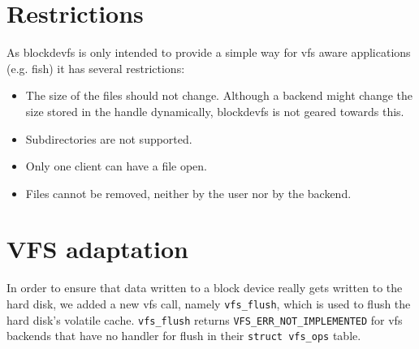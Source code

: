 \section{Restrictions}

As blockdevfs is only intended to provide a simple way for \acs{vfs} aware
applications (e.g. fish) it has several restrictions:

\begin{itemize}
 \item The size of the files should not change. Although a backend might change
	 the size stored in the handle dynamically, blockdevfs is not geared
	 towards this.
 \item Subdirectories are not supported.
 \item Only one client can have a file open.
 \item Files cannot be removed, neither by the user nor by the backend.
\end{itemize}

\section{VFS adaptation}

In order to ensure that data written to a block device really gets written to
the hard disk, we added a new \acs{vfs} call, namely \lstinline+vfs_flush+,
which is used to flush the hard disk's volatile cache. \lstinline+vfs_flush+
returns \lstinline+VFS_ERR_NOT_IMPLEMENTED+ for \acs{vfs} backends that have no
handler for flush in their \lstinline+struct vfs_ops+ table.

